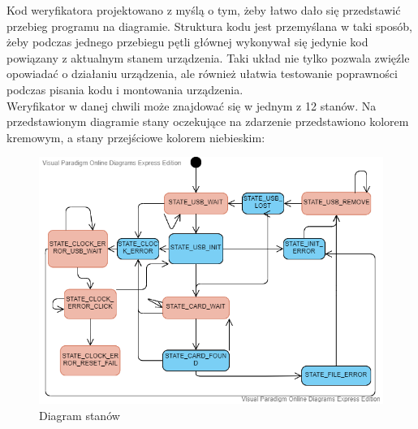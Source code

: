\documentclass[declaration,shortabstract, mgr]{iithesis}
\begin{document}
\indent Kod weryfikatora projektowano z myślą o tym, żeby łatwo dało się przedstawić przebieg programu na diagramie. Struktura kodu jest przemyślana w taki sposób, żeby podczas jednego przebiegu pętli głównej wykonywał się jedynie kod powiązany z aktualnym stanem urządzenia. Taki układ nie tylko pozwala zwięźle opowiadać o działaniu urządzenia, ale również ułatwia testowanie poprawności podczas pisania kodu i montowania urządzenia.\\
\indent Weryfikator w danej chwili może znajdować się w jednym z 12 stanów. Na przedstawionym diagramie stany oczekujące na zdarzenie przedstawiono kolorem kremowym, a stany przejściowe kolorem niebieskim:
\begin{figure}[h]
\caption{Diagram stanów}
\centering
\includegraphics[scale=0.6]{state_machine.png}
\end{figure}
\end{document}
